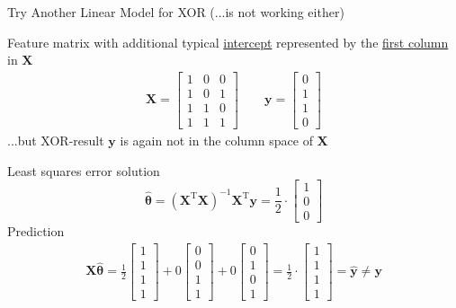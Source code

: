 \documentclass[mathserif, aspectratio=1610]{intbeamer}
\begin{document}
\begin{frame}[t]{Try Another Linear Model for XOR (...is not working either)}

Feature matrix with additional typical \underline{intercept} represented by the \underline{first column} in $\bm{X}$
\begin{align*}
\bm{X} =
\begin{bmatrix}
1 & 0 & 0\\
1 & 0 & 1\\
1 & 1 & 0\\
1 & 1 & 1
\end{bmatrix}\qquad
\bm{y} =
\begin{bmatrix}
0\\
1\\
1\\
0
\end{bmatrix}
\end{align*}
...but XOR-result $\bm{y}$ is again not in the column space of $\bm{X}$


Least squares error solution
$$\hat{\bm{\theta}} = (\bm{X}^\mathrm{T} \bm{X})^{-1} \bm{X}^\mathrm{T} \bm{y}
=
\frac{1}{2}\cdot
\begin{bmatrix}
1\\
0\\
0
\end{bmatrix}
$$
Prediction
\begin{align*}
\bm{X} \hat{\bm{\theta}} =
\frac{1}{2}
\begin{bmatrix}
1\\
1\\
1\\
1
\end{bmatrix}
+
0
\begin{bmatrix}
0\\
0\\
1\\
1
\end{bmatrix}
+
0
\begin{bmatrix}
0\\
1\\
0\\
1
\end{bmatrix}
=
\frac{1}{2}\cdot
\begin{bmatrix}
1\\
1\\
1\\
1
\end{bmatrix}
=\hat{\bm{y}} \neq \bm{y}
\end{align*}
\end{frame}
\end{document}
